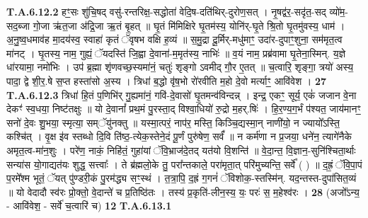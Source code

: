 \documentclass[17pt]{extarticle}
\begin{document}
                  \newline
                                                                  \textbf{ T.A.6.12.2} \newline
                  हꣳ॒॒सः शु॑चि॒षद् वसु॑-रन्तरिक्ष॒-सद्धोता॑ वेदि॒ष-दति॑थिर्-दुरोण॒सत् ।  नृ॒षद्व॑र॒-सदृ॑त॒-सद् व्यो॑म॒-सद॒ब्जा गो॒जा ऋ॑त॒जा अ॑द्रि॒जा ऋ॒तं बृ॒हत् ॥  घृ॒तं मि॑मिक्षिरे घृ॒तम॑स्य॒ योनि॑र्-घृ॒ते श्रि॒तो घृ॒तमु॑वस्य॒ धाम॑ ।  अ॒नु॒ष्व॒धमाव॑ह मा॒दय॑स्व॒ स्वाहा॑ कृतं ॅवृषभ वक्षि ह॒व्यं ॥  स॒मु॒द्रा दू॒र्मिर्-मधु॑माꣳ॒॒ उदा॑र-दुपाꣳ॒॒शुना॒ सम॑मृत॒त्व मा॑नट् ।  घृ॒तस्य॒ नाम॒ गुह्यं॒ ॅयदस्ति॑ जि॒ह्वा दे॒वाना॑-म॒मृत॑स्य॒ नाभिः॑ ॥  व॒यं नाम॒ प्रब्र॑वामा घृ॒तेना॒स्मिन्. य॒ज्ञे धा॑रयामा॒ नमो॑भिः ।  उप॑ ब्र॒ह्मा शृ॑णवच्छ॒स्यमा॑नं॒ चतुः॑ शृङ्गो ऽवमीद् गौ॒र ए॒तत् ॥  च॒त्वारि॒ शृङ्गा॒ त्रयो॑ अस्य॒ पादा॒ द्वे शी॒र॒.षे स॒प्त हस्ता॑सो अ॒स्य ।  त्रिधा॑ ब॒द्धो वृ॑ष॒भो रो॑रवीति म॒हो दे॒वो मर्त्याꣳ॒॒ आवि॑वेश । \textbf{ 27} \newline
                  \newline
                                                                  \textbf{ T.A.6.12.3} \newline
                  त्रिधा॑ हि॒तं प॒णिभि॑र् गु॒ह्यमा॑नं॒ गवि॑-दे॒वासो॑ घृ॒तमन्व॑विन्दन्न् । इन्द्र॒ एकꣳ॒॒ सूर्य॒ एकं॑ जजान वे॒ना देकꣳ॑ स्व॒धया॒ निष्ट॑तक्षुः ॥  यो दे॒वानां᳚ प्रथ॒मं पु॒रस्ता॒द् विश्वा॒धियो॑ रु॒द्रो म॒हर्.षिः॑ । हि॒र॒ण्य॒ग॒र्भं प॑श्यत॒ जाय॑मानꣳ॒॒ सनो॑ दे॒वः शु॒भया॒ स्मृत्या॒ सम्ॅयु॑नक्तु ॥ यस्मा॒त्परं॒ नाप॑र॒ मस्ति॒ किञ्चि॒द्यस्मा॒न् नाणी॑यो॒ न ज्यायो᳚ऽस्ति॒ कश्चि॑त् ।  वृ॒क्ष इ॑व स्तब्धो दि॒वि ति॑ष्ठ॒-त्येक॒स्तेने॒दं पू॒र्णं पुरु॑षेण॒ सर्वं᳚ ॥  न कर्म॑णा न प्र॒जया॒ धने॑न॒ त्यागे॑नैके अमृत॒त्व-मा॑न॒शुः ।  परे॑ण॒ नाकं॒ निहि॑तं॒ गुहा॑यां ॅवि॒भ्राज॑दे॒तद् यत॑यो वि॒शन्ति॑ ॥ वे॒दा॒न्त॒ वि॒ज्ञान॒-सुनि॑श्चिता॒र्थाः सन्या॑स यो॒गाद्यत॑यः शुद्ध॒ सत्त्वाः᳚ ।  ते ब्र॑ह्मलो॒के तु॒ परा᳚न्तकाले॒ परा॑मृता॒त् परि॑मुच्यन्ति॒ सर्वे᳚ ( ) ॥ द॒ह्रं॒ ॅवि॒पा॒पं प॒रमे᳚श्म भूतं॒ ॅयत् पु॑ण्डरी॒कं पु॒रम॑द्ध्य सꣳ॒॒स्थं । त॒त्रा॒पि॒ द॒ह्रं ग॒गनं॑ ॅविशोक॒-स्तस्मि॑न्. यद॒न्तस्त-दुपा॑सित॒व्यं ॥  यो वेदादौ स्व॑रः प्रो॒क्तो॒ वे॒दान्ते॑ च  प्र॒तिष्ठि॑तः । तस्य॑ प्र॒कृति॑-लीन॒स्य॒ यः॒ परः॑ स॒ म॒हेश्व॑रः । \textbf{ 28} \newline
                  \newline
                                                        (अजो᳚ऽन्य॒ - आवि॑वेश॒ - सर्वे॑ च॒त्वारि॑ च) \textbf{12} \newline \newline
                                \textbf{ T.A.6.13.1} \newline
\end{document}
